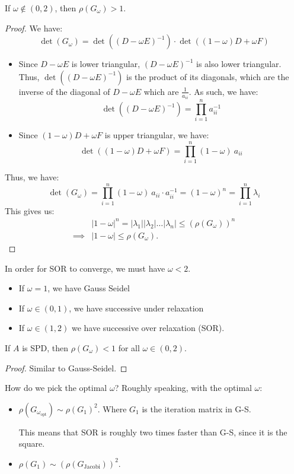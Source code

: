 \documentclass[../main/main.tex]{subfiles}
\begin{document}
\begin{theorem}
If $\omega \not\in(0,2)$, then $\rho(G_{\omega})>1$.
\end{theorem}
\begin{proof}
  We have:
  \[
    \det(G_{\omega}) = \det((D-\omega E)^{-1}) \cdot \det((1-\omega)D +\omega F)
  \]
\begin{itemize}
        \item
  Since $D-\omega E$ is lower triangular, $(D-\omega E)^{-1}$ is also lower triangular. Thus, $\det((D-\omega E)^{-1})$ is the product of its diagonals, which are the inverse of the diagonal of $D-\omega E$ which are $\frac{1}{a_{i i}}$. As such, we have: \[
    \det ((D-\omega E)^{-1}) = \prod_{i=1}^n a_{ii}^{-1}
        \]
  \item Since $(1-\omega)D +\omega F$ is upper triangular, we have: \[
        \det ((1-\omega)D +\omega F) = \prod_{i=1}^n (1-\omega)~a_{ii}
        \]
\end{itemize}
Thus, we have: \[
  \det (G_{\omega}) = \prod_{i=1}^n (1-\omega)~a_{ii} \cdot a_{ii}^{-1} = (1-\omega)^{n} = \prod_{i=1}^n \lambda_{i}
\]
This gives us:
\begin{align*}
  & |1-\omega|^{n} = | \lambda_{1}|| \lambda_{2}|\ldots| \lambda_{n}| \leq (\rho(G_{\omega}))^{n} \\
  \implies & |1-\omega| \leq \rho(G_{\omega})
  .\end{align*}
\end{proof}
\begin{corollary}
In order for SOR to converge, we must have $\omega < 2$.
\end{corollary}
\begin{itemize}
\item If $\omega = 1$, we have Gauss Seidel
  \item If $\omega  \in (0,1)$, we have successive under relaxation
        \item If $\omega \in (1,2)$ we have successive over relaxation (SOR).
\end{itemize}
\begin{theorem}
If $A$ is SPD, then $\rho (G_{\omega })<1$ for all $\omega \in (0,2)$.
\end{theorem}
\begin{proof}
Similar to Gauss-Seidel.
\end{proof}
How do we pick the optimal $\omega $? Roughly speaking, with the optimal $\omega $:
\begin{itemize}
\item $\rho (G_{\omega_{\text{opt}}})\sim \rho (G_{1})^2$. Where $G_{1}$ is the iteration matrix in G-S.
        \begin{remark}
This means that SOR is roughly two times faster than G-S, since it is the square.
        \end{remark}
        \item $\rho (G_{1})\sim (\rho(G_{\text{Jacobi}}))^2$.
\end{itemize}
\end{document}
